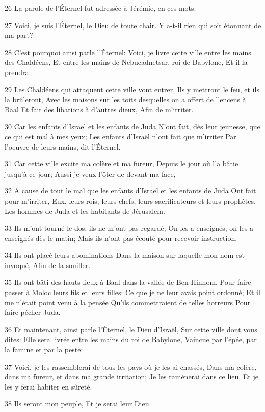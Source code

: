 \par 26 La parole de l'Éternel fut adressée à Jérémie, en ces mots:
\par 27 Voici, je suis l'Éternel, le Dieu de toute chair. Y a-t-il rien qui soit étonnant de ma part?
\par 28 C'est pourquoi ainsi parle l'Éternel: Voici, je livre cette ville entre les mains des Chaldéens, Et entre les mains de Nebucadnetsar, roi de Babylone, Et il la prendra.
\par 29 Les Chaldéens qui attaquent cette ville vont entrer, Ils y mettront le feu, et ils la brûleront, Avec les maisons sur les toits desquelles on a offert de l'encens à Baal Et fait des libations à d'autres dieux, Afin de m'irriter.
\par 30 Car les enfants d'Israël et les enfants de Juda N'ont fait, dès leur jeunesse, que ce qui est mal à mes yeux; Les enfants d'Israël n'ont fait que m'irriter Par l'oeuvre de leurs mains, dit l'Éternel.
\par 31 Car cette ville excite ma colère et ma fureur, Depuis le jour où l'a bâtie jusqu'à ce jour; Aussi je veux l'ôter de devant ma face,
\par 32 A cause de tout le mal que les enfants d'Israël et les enfants de Juda Ont fait pour m'irriter, Eux, leurs rois, leurs chefs, leurs sacrificateurs et leurs prophètes, Les hommes de Juda et les habitants de Jérusalem.
\par 33 Ils m'ont tourné le dos, ils ne m'ont pas regardé; On les a enseignés, on les a enseignés dès le matin; Mais ils n'ont pas écouté pour recevoir instruction.
\par 34 Ils ont placé leurs abominations Dans la maison sur laquelle mon nom est invoqué, Afin de la souiller.
\par 35 Ils ont bâti des hauts lieux à Baal dans la vallée de Ben Hinnom, Pour faire passer à Moloc leurs fils et leurs filles: Ce que je ne leur avais point ordonné; Et il me n'était point venu à la pensée Qu'ils commettraient de telles horreurs Pour faire pécher Juda.
\par 36 Et maintenant, ainsi parle l'Éternel, le Dieu d'Israël, Sur cette ville dont vous dites: Elle sera livrée entre les mains du roi de Babylone, Vaincue par l'épée, par la famine et par la peste:
\par 37 Voici, je les rassemblerai de tous les pays où je les ai chassés, Dans ma colère, dans ma fureur, et dans ma grande irritation; Je les ramènerai dans ce lieu, Et je les y ferai habiter en sûreté.
\par 38 Ils seront mon peuple, Et je serai leur Dieu.
